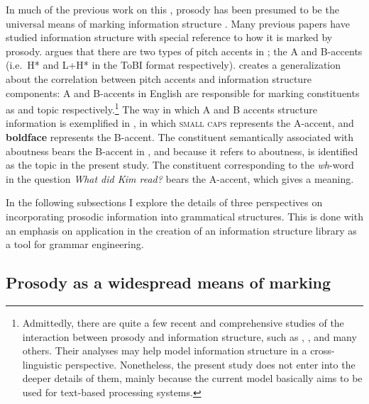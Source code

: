 In much of the previous work on this , prosody has been presumed
to be the universal means of marking information structure
\citep{gundel:99,buring:10}. Many
previous papers have studied information structure with special
reference to how it is marked by prosody.  \citet{bolinger:58} argues
that there are two types of pitch accents in ; the A and
B-accents (i.e.\ H* and L+H* in the ToBI format respectively).
\citet{jackendoff:72} creates a generalization about the correlation
between pitch accents and information structure components: A and
B-accents in English are responsible for marking constituents as 
and topic respectively.\footnote{Admittedly, there are quite a few
  recent and comprehensive studies of the interaction between prosody
  and information structure, such as \citet{ladd:08}, 
  \citet{chen:12}, and many others. Their analyses may help model information structure
  in a cross-linguistic perspective. Nonetheless, the present study
  does not enter into the deeper details of them, mainly because the
  current model basically aims to be used for text-based processing
  systems. }  The way in which A and B accents structure information
is exemplified in , in which \textsc{small caps}
represents the A-accent, and \textbf{boldface} represents the
B-accent. The constituent semantically associated with aboutness bears
the B-accent in , and because it refers to aboutness, is
identified as the topic in the present study.  The constituent
corresponding to the \textit{wh}-word in the question \textit{What did
  Kim read?} bears the A-accent, which gives a  meaning.




In the following subsections I explore the details of three
perspectives on incorporating prosodic information into grammatical
structures.  This is done with an emphasis on application in the
creation of an information structure library as a tool for grammar
engineering.


\subsection{Prosody as a widespread means of marking}
\label{4:ssec:universal}

